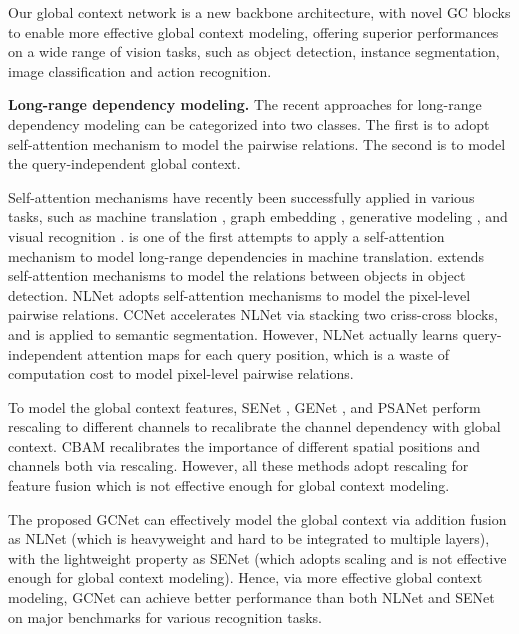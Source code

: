 \documentclass[10pt,twocolumn,letterpaper]{article}
\begin{document}
Our global context network is a new backbone architecture, with novel GC blocks to enable more effective global context modeling, offering superior performances on a wide range of vision tasks, such as object detection, instance segmentation, image classification and action recognition.

\textbf{Long-range dependency modeling.} 
The recent approaches for long-range dependency modeling can be categorized into two classes. The first is to adopt self-attention mechanism to model the pairwise relations. The second is to model the query-independent global context.

Self-attention mechanisms have recently been successfully applied in various tasks, such as machine translation \cite{gehring2016convolutional,gehring2017convolutional,vaswani2017attention}, graph embedding \cite{velivckovic2017GAT}, generative modeling \cite{zhang2018SAGAN}, and visual recognition \cite{wang2017residual,hu2018relation,wang2017non,yuan2018ocnet}.
\cite{vaswani2017attention} is one of the first attempts to apply a self-attention mechanism to model long-range dependencies in machine translation. 
\cite{hu2018relation} extends self-attention mechanisms to model the relations between objects in object detection.
NLNet \cite{wang2017non} adopts self-attention mechanisms to model the pixel-level pairwise relations.
CCNet \cite{huang2018ccnet} accelerates NLNet via stacking two criss-cross blocks, and is applied to semantic segmentation.
However, NLNet actually learns query-independent attention maps for each query position, which is a waste of computation cost to model pixel-level pairwise relations.


To model the global context features, SENet \cite{hu2018senet}, GENet \cite{hu2018gather}, and PSANet \cite{zhao2018psanet}  perform rescaling to different channels to recalibrate the channel dependency with global context.
CBAM \cite{woo2018cbam} recalibrates the importance of different spatial positions and channels both via rescaling.
However, all these methods adopt rescaling for feature fusion which is not effective enough for global context modeling.


The proposed GCNet can effectively model the global context via addition fusion as NLNet \cite{wang2017non} (which is heavyweight and hard to be integrated to multiple layers), with the lightweight property as SENet \cite{hu2018senet} (which adopts scaling and is not effective enough for global context modeling).
Hence, via more effective global context modeling, GCNet can achieve better performance than both NLNet and SENet on major benchmarks for various recognition tasks.
\end{document}
